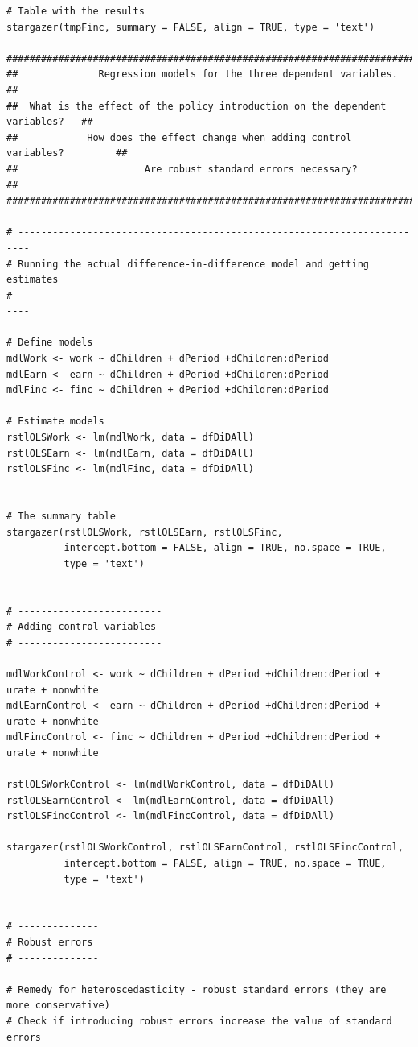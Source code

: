 \documentclass{article}
\begin{document}
\begin{tiny}
\begin{verbatim}
# Table with the results
stargazer(tmpFinc, summary = FALSE, align = TRUE, type = 'text')

##################################################################################
##              Regression models for the three dependent variables.            ##
##  What is the effect of the policy introduction on the dependent variables?   ##
##            How does the effect change when adding control variables?         ##
##                      Are robust standard errors necessary?                   ##
##################################################################################

# ------------------------------------------------------------------------
# Running the actual difference-in-difference model and getting estimates
# ------------------------------------------------------------------------

# Define models
mdlWork <- work ~ dChildren + dPeriod +dChildren:dPeriod
mdlEarn <- earn ~ dChildren + dPeriod +dChildren:dPeriod
mdlFinc <- finc ~ dChildren + dPeriod +dChildren:dPeriod

# Estimate models
rstlOLSWork <- lm(mdlWork, data = dfDiDAll)
rstlOLSEarn <- lm(mdlEarn, data = dfDiDAll)
rstlOLSFinc <- lm(mdlFinc, data = dfDiDAll)


# The summary table
stargazer(rstlOLSWork, rstlOLSEarn, rstlOLSFinc,
          intercept.bottom = FALSE, align = TRUE, no.space = TRUE,
          type = 'text')


# -------------------------
# Adding control variables
# -------------------------

mdlWorkControl <- work ~ dChildren + dPeriod +dChildren:dPeriod + urate + nonwhite
mdlEarnControl <- earn ~ dChildren + dPeriod +dChildren:dPeriod + urate + nonwhite
mdlFincControl <- finc ~ dChildren + dPeriod +dChildren:dPeriod + urate + nonwhite

rstlOLSWorkControl <- lm(mdlWorkControl, data = dfDiDAll)
rstlOLSEarnControl <- lm(mdlEarnControl, data = dfDiDAll)
rstlOLSFincControl <- lm(mdlFincControl, data = dfDiDAll)

stargazer(rstlOLSWorkControl, rstlOLSEarnControl, rstlOLSFincControl,
          intercept.bottom = FALSE, align = TRUE, no.space = TRUE,
          type = 'text')


# --------------
# Robust errors
# --------------

# Remedy for heteroscedasticity - robust standard errors (they are more conservative)
# Check if introducing robust errors increase the value of standard errors


\end{verbatim}
\end{tiny}
\end{document}
